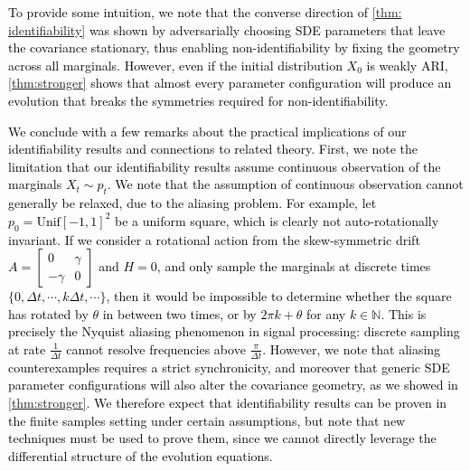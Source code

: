 \documentclass[twoside,11pt]{article}
\newcommand{\N}{\mathbb{N}}
\newcommand{\rv}[1]{\textcolor{black}{#1}}
\begin{document}
\rv{To provide some intuition, we note that the converse direction of \cref{thm: identifiability} was shown by adversarially choosing SDE parameters that leave the covariance stationary, thus enabling non-identifiability by fixing the geometry across all marginals. However, even if the initial distribution $X_0$ is weakly ARI, \cref{thm:stronger} shows that almost every parameter configuration will produce an evolution that breaks the symmetries required for non-identifiability.}

\rv{We conclude with a few remarks about the practical implications of our identifiability results and connections to related theory. First, we note the limitation that our identifiability results assume continuous observation of the marginals $X_t \sim p_t$. We note that the assumption of continuous observation cannot generally be relaxed, due to the aliasing problem. For example, let $p_0 = \textrm{Unif}[-1,1]^2$ be a uniform square, which is clearly not auto-rotationally invariant. If we consider a rotational action from the skew-symmetric drift $A=\begin{bmatrix} 0 & \gamma \\ -\gamma & 0\end{bmatrix}$ and $H=0$, and only sample the marginals at discrete times $\{0, \Delta t, \cdots , k\Delta t, \cdots \}$, then it would be impossible to determine whether the square has rotated by $\theta$ in between two times, or by  $2\pi k + \theta$ for any $k \in \N$. This is precisely the Nyquist aliasing phenomenon in signal processing: discrete sampling at rate $\frac{1}{\Delta t}$ cannot resolve frequencies above $\frac{\pi}{\Delta t}$. However, we note that aliasing counterexamples requires a strict synchronicity, and moreover that generic SDE parameter configurations will also alter the covariance geometry, as we showed in \cref{thm:stronger}. We therefore expect that identifiability results can be proven in the finite samples setting under certain assumptions, but note that new techniques must be used to prove them, since we cannot directly leverage the differential structure of the evolution equations.}
\end{document}
